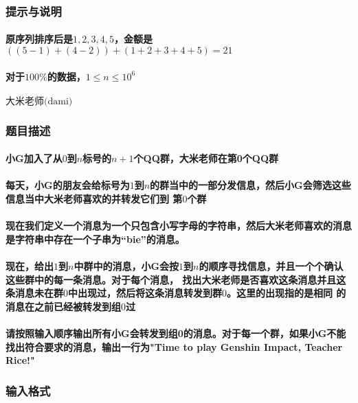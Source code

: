 \documentclass[final,11pt,oneside,UTF8]{report}
\begin{document}
\subsubsection{提示与说明}
\paragraph{原序列排序后是$1,2,3,4,5$，金额是$((5-1)+(4-2))+(1+2+3+4+5)=21$}
\paragraph{对于$100\%$的数据，$1 \le n \le 10^6$}
\newpage

\centerline{\LARGE{$\textbf{大米老师}\text{(dami)}$}}
\subsubsection{题目描述}
\paragraph{
    小G加入了从$0$到$n$标号的$n+1$个QQ群，大米老师在第0个QQ群
}
\paragraph{
    每天，小G的朋友会给标号为$1$到$n$的群当中的一部分发信息，然后小G会筛选这些信息当中大米老师喜欢的并转发它们到
    第$0$个群
}
\paragraph{
    现在我们定义一个消息为一个只包含小写字母的字符串，然后大米老师喜欢的消息是字符串中存在一个子串为“bie”的消息。
}
\paragraph{
    现在，给出$1$到$n$中群中的消息，小G会按$1$到$n$的顺序寻找信息，并且一个个确认这些群中的每一条消息。对于每个消息，
    找出大米老师是否喜欢这条消息并且这条消息未在群$0$中出现过，然后将这条消息转发到群$0$。这里的出现指的是相同
    的消息在之前已经被转发到组$0$过
}
\paragraph{
    请按照输入顺序输出所有小G会转发到组0的消息。对于每一个群，如果小G不能找出符合要求的消息，输出一行为"Time to play Genshin
    Impact, Teacher Rice!"
}
\subsubsection{输入格式}
\end{document}

